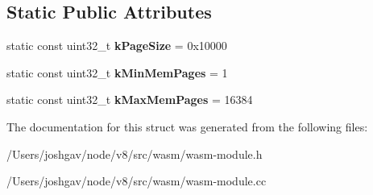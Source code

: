 \subsection*{Static Public Attributes}
\begin{DoxyCompactItemize}
\item 
static const uint32\+\_\+t {\bfseries k\+Page\+Size} = 0x10000\hypertarget{structv8_1_1internal_1_1wasm_1_1_wasm_module_aa1eb943cfb41d8ca5f17bb03f0166e70}{}\label{structv8_1_1internal_1_1wasm_1_1_wasm_module_aa1eb943cfb41d8ca5f17bb03f0166e70}

\item 
static const uint32\+\_\+t {\bfseries k\+Min\+Mem\+Pages} = 1\hypertarget{structv8_1_1internal_1_1wasm_1_1_wasm_module_a078d3aaed6c131e67429991252ad03aa}{}\label{structv8_1_1internal_1_1wasm_1_1_wasm_module_a078d3aaed6c131e67429991252ad03aa}

\item 
static const uint32\+\_\+t {\bfseries k\+Max\+Mem\+Pages} = 16384\hypertarget{structv8_1_1internal_1_1wasm_1_1_wasm_module_a83b3491c78cfb8a38607e3bc1438e6da}{}\label{structv8_1_1internal_1_1wasm_1_1_wasm_module_a83b3491c78cfb8a38607e3bc1438e6da}

\end{DoxyCompactItemize}


The documentation for this struct was generated from the following files\+:\begin{DoxyCompactItemize}
\item 
/\+Users/joshgav/node/v8/src/wasm/wasm-\/module.\+h\item 
/\+Users/joshgav/node/v8/src/wasm/wasm-\/module.\+cc\end{DoxyCompactItemize}
